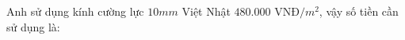 \documentclass[preview]{standalone}
\begin{document}
\begin{center}
Anh sử dụng kính cường lực $10 mm$ Việt Nhật $480.000$ VNĐ$/m^2$, vậy số tiền cần sử dụng là:
\end{center}
\end{document}
